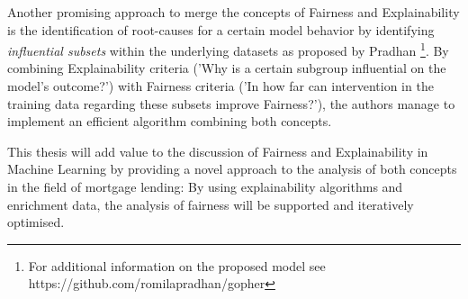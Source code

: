 




Another promising approach to merge the concepts of Fairness and Explainability is the identification of root-causes for a certain model behavior by identifying \textit{influential subsets} within the underlying datasets as proposed by Pradhan \parencite{Pradhan2022}\footnote{For additional information on the proposed model see https://github.com/romilapradhan/gopher}.
By combining Explainability criteria ('Why is a certain subgroup influential on the model's outcome?') with Fairness criteria ('In how far can intervention in the training data regarding these subsets improve Fairness?'), the authors manage to implement an efficient algorithm combining both concepts.


This thesis will add value to the discussion of Fairness and Explainability in Machine Learning by providing a novel approach to the analysis of both concepts in the field of mortgage lending: 
By using explainability algorithms and enrichment data, the analysis of fairness will be supported and iteratively optimised.